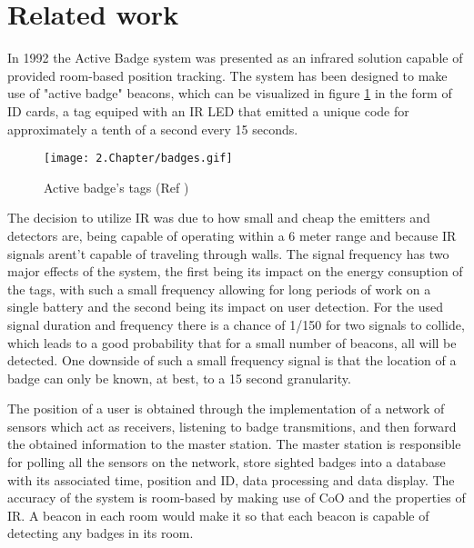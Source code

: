 \section{Related work}
\label{sec:related}



\label{subsec:badge}


In 1992 the Active Badge system \cite{badge} was presented as an infrared solution capable of provided room-based position tracking. The system has been designed to make use of "active badge" beacons, which can be visualized in figure \ref{fig:badge} in the form of ID cards, a tag equiped with an \ac{IR} LED that emitted a unique code for approximately a tenth of a second every 15 seconds.

\begin{figure}[H]
	\centering
		\texttt{[image: 2.Chapter/badges.gif]}
	\caption[Active badge's tags (Ref \cite{badgefig}) ]{Active badge's tags (Ref \cite{badgefig}) }
	\label{fig:badge}
\end{figure}

The decision to utilize \ac{IR} was due to how small and cheap the emitters and detectors are, being capable of operating within a 6 meter range and because \ac{IR} signals arent't capable of traveling through walls. The signal frequency has two major effects of the system, the first being its impact on the energy consuption of the tags, with such a small frequency allowing for long periods of work on a single battery and the second being its impact on user detection. For the used signal duration and frequency there is a chance of 1/150 for two signals to collide, which leads to a good probability that for a small number of beacons, all will be detected. One downside of such a small frequency signal is that the location of a badge can only be known, at best, to a 15 second granularity.

The position of a user is obtained through the implementation of a network of sensors which act as receivers, listening to badge transmitions, and then forward the obtained information to the master station. The master station is responsible for polling all the sensors on the network, store sighted badges into a database with its associated time, position and ID, data processing and data display. The accuracy of the system is room-based by making use of \ac{CoO} and the properties of \ac{IR}. A beacon in each room would make it so that each beacon is capable of detecting any badges in its room.

